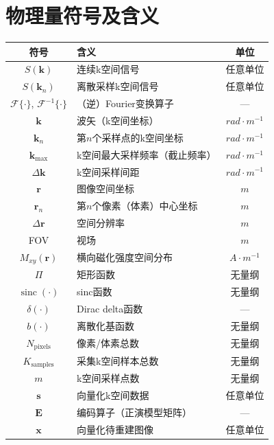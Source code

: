 \documentclass[12pt]{article}
\begin{document}
\newpage
\appendix
\section{物理量符号及含义}
\begin{table}[h]
    \small
    \centering
    \begin{tabularx}{\textwidth}{c X c}
        \toprule
        \textbf{符号} & \textbf{含义} & \textbf{单位} \\
        \midrule
        $S(\bm{k})$ & 连续k空间信号 & 任意单位 \\
        $S(\bm{k}_n)$ & 离散采样k空间信号 & 任意单位 \\
        $\mathcal{F}\{\cdot\}$, $\mathcal{F}^{-1}\{\cdot\}$ & （逆）Fourier变换算子 & --- \\
        $\bm{k}$ & 波矢（k空间坐标） & $\si{rad\cdot m^{-1}}$ \\
        $\bm{k}_n$ & 第$n$个采样点的k空间坐标 & $\si{rad\cdot m^{-1}}$ \\
        $\bm{k}_{\max}$ & k空间最大采样频率（截止频率） & $\si{rad\cdot m^{-1}}$ \\
        $\Delta\bm{k}$ & k空间采样间距 & $\si{rad\cdot m^{-1}}$ \\
        $\bm{r}$ & 图像空间坐标 & $\si{m}$ \\
        $\bm{r}_n$ & 第$n$个像素（体素）中心坐标 & $\si{m}$ \\
        $\Delta\bm{r}$ & 空间分辨率 & $\si{m}$ \\
        FOV & 视场 & $\si{m}$ \\
        $M_{xy}(\bm{r})$ & 横向磁化强度空间分布 & $\si{A\cdot m^{-1}}$ \\
        $\Pi$ & 矩形函数 & 无量纲 \\
        $\operatorname{sinc}(\cdot)$ & sinc函数 & 无量纲 \\
        $\delta(\cdot)$ & Dirac delta函数 & --- \\
        $b(\cdot)$ & 离散化基函数 & 无量纲 \\
        $N_{\text{pixels}}$ & 像素/体素总数 & 无量纲 \\
        $K_{\text{samples}}$ & 采集k空间样本总数 & 无量纲 \\
        $m$ & k空间采样点数 & 无量纲 \\
        $\bm{s}$ & 向量化k空间数据 & 任意单位 \\
        $\mathbf{E}$ & 编码算子（正演模型矩阵） & --- \\
        $\bm{x}$ & 向量化待重建图像 & 任意单位 \\

\end{tabularx}
\end{table}
\end{document}
